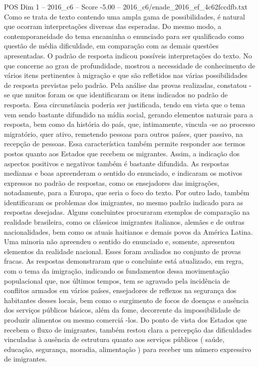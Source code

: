 \begin{textsample}{POS Dim 1 – 2016\_c6 – Score -5.00 – 2016\_c6/enade\_2016\_ef\_4c62fccdfb.txt}
Como se trata de texto contendo uma ampla gama de possibilidades, é natural que ocorram interpretações diversas das esperadas.
Do mesmo modo, a contemporaneidade do tema encaminha o enunciado para ser qualificado como questão de média dificuldade, em comparação com as demais questões apresentadas.
O padrão de resposta indicou possíveis interpretações do texto.
No que concerne ao grau de profundidade, mostrou a necessidade de conhecimento de vários itens pertinentes à migração e que são refletidos nas várias possibilidades de resposta previstas pelo padrão.
Pela análise das provas realizadas, constatou -se que muitos foram os que identificaram os itens indicados no padrão de resposta.
Essa circunstância poderia ser justificada, tendo em vista que o tema vem sendo bastante difundido na mídia social, gerando elementos naturais para a resposta, bem como da história do país, que, intimamente, vincula -se ao processo migratório, quer ativo, remetendo pessoas para outros países, quer passivo, na recepção de pessoas.
Essa característica também permite responder aos termos postos quanto aos Estados que recebem os migrantes.
Assim, a indicação dos aspectos positivos e negativos também é bastante difundida.
As respostas medianas e boas apreenderam o sentido do enunciado, e indicaram os motivos expressos no padrão de respostas, como os ensejadores das imigrações, notadamente, para a Europa, que seria o foco do texto.
Por outro lado, também identificaram os problemas dos imigrantes, no mesmo padrão indicado para as respostas desejadas.
Alguns concluintes procuraram exemplos de comparação na realidade brasileira, como os clássicos imigrantes italianos, alemães e de outras nacionalidades, bem como os atuais haitianos e demais povos da América Latina.
Uma minoria não apreendeu o sentido do enunciado e, somente, apresentou elementos da realidade nacional.
Esses foram avaliados no conjunto de provas fracas.
As respostas demonstraram que o concluinte está atualizado, em regra, com o tema da imigração, indicando os fundamentos dessa movimentação populacional que, nos últimos tempos, tem se agravado pela incidência de conflitos armados em vários países, ensejadores de reflexos na segurança dos habitantes desses locais, bem como o surgimento de focos de doenças e ausência dos serviços públicos básicos, além da fome, decorrente da impossibilidade de produzir alimentos ou mesmo comerciá -los.
Do ponto de vista dos Estados que recebem o fluxo de imigrantes, também restou clara a percepção das dificuldades vinculadas à ausência de estrutura quanto aos serviços públicos ( saúde, educação, segurança, moradia, alimentação ) para receber um número expressivo de imigrantes.

\end{textsample}
